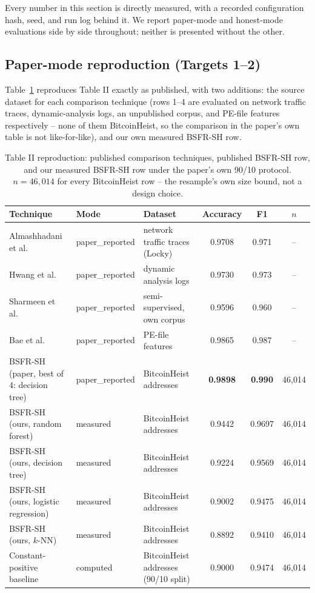 \documentclass[conference]{IEEEtran}
\begin{document}
Every number in this section is directly measured, with a recorded configuration hash, seed,
and run log behind it. We report paper-mode and honest-mode evaluations side by side throughout;
neither is presented without the other.

\subsection{Paper-mode reproduction (Targets 1--2)}
\label{sec:5a}

Table~\ref{tab:table2} reproduces Table II exactly as published, with two additions: the source
dataset for each comparison technique (rows 1--4 are evaluated on network traffic traces,
dynamic-analysis logs, an unpublished corpus, and PE-file features respectively -- none of them
BitcoinHeist, so the comparison in the paper's own table is not like-for-like), and our own
measured BSFR-SH row.

\begin{table}[t]
\centering
\caption{Table II reproduction: published comparison techniques, published BSFR-SH row, and our
measured BSFR-SH row under the paper's own 90/10 protocol. $n=46{,}014$ for every BitcoinHeist
row -- the resample's own size bound, not a design choice.}
\label{tab:table2}
\footnotesize
\begin{tabular}{lllccc}
\hline
\textbf{Technique} & \textbf{Mode} & \textbf{Dataset} & \textbf{Accuracy} & \textbf{F1} & \textbf{$n$} \\
\hline
Almashhadani et al.\ \cite{almashhadani} & paper\_reported & network traffic traces (Locky) & 0.9708 & 0.971 & -- \\
Hwang et al.\ \cite{hwang} & paper\_reported & dynamic analysis logs & 0.9730 & 0.973 & -- \\
Sharmeen et al.\ \cite{sharmeen} & paper\_reported & semi-supervised, own corpus & 0.9596 & 0.960 & -- \\
Bae et al.\ \cite{bae} & paper\_reported & PE-file features & 0.9865 & 0.987 & -- \\
BSFR-SH (paper, best of 4: decision tree) & paper\_reported & BitcoinHeist addresses & \textbf{0.9898} & \textbf{0.990} & 46{,}014 \\
\hline
BSFR-SH (ours, random forest) & measured & BitcoinHeist addresses & 0.9442 & 0.9697 & 46{,}014 \\
BSFR-SH (ours, decision tree) & measured & BitcoinHeist addresses & 0.9224 & 0.9569 & 46{,}014 \\
BSFR-SH (ours, logistic regression) & measured & BitcoinHeist addresses & 0.9002 & 0.9475 & 46{,}014 \\
BSFR-SH (ours, $k$-NN) & measured & BitcoinHeist addresses & 0.8892 & 0.9410 & 46{,}014 \\
\hline
Constant-positive baseline & computed & BitcoinHeist addresses (90/10 split) & 0.9000 & 0.9474 & 46{,}014 \\
\hline
\end{tabular}
\end{table}
\end{document}

